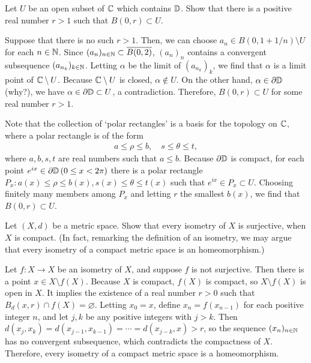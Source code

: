 \begin{prob}
    Let $U$ be an open subset of ${\mathbb{C}}$ which contains ${\mathbb{D}}$.
    Show that there is a positive real number $r>1$ such that $B(0, r)\subset U$.
\end{prob}
\begin{sol}
    Suppose that there is no such $r>1$.
    Then, we can choose $a_n\in B(0, 1+1/n)\setminus U$ for each $n\in{\mathbb{N}}$.
    Since $(a_n)_{n\in{\mathbb{N}}}\subset\overline{B(0, 2)}$, $(a_n)_n$ contains a convergent subsequence $(a_{n_k})_{k\in{\mathbb{N}}}$.
    Letting $\alpha$ be the limit of $(a_{n_k})_k$, we find that $\alpha$ is a limit point of ${\mathbb{C}}\setminus U$.
    Because ${\mathbb{C}}\setminus U$ is closed, $\alpha\notin U$.
    On the other hand, $\alpha\in\partial{\mathbb{D}}$ \color{brown}(why?)\color{black}, we have $\alpha\in\partial{\mathbb{D}}\subset U$, a contradiction.
    Therefore, $B(0, r)\subset U$ for some real number $r>1$.
\end{sol}
\begin{sol}
    Note that the collection of `polar rectangles' is a basis for the topology on ${\mathbb{C}}$, where a polar rectangle is of the form
    \begin{align*}
        a\leq \rho\leq b,\quad s\leq \theta\leq t,
    \end{align*}
    where $a, b, s, t$ are real numbers such that $a\leq b$.
    Because $\partial{\mathbb{D}}$ is compact, for each point $e^{ix}\in\partial{\mathbb{D}}\,(0\leq x<2\pi)$ there is a polar rectangle $P_x: a(x)\leq \rho\leq b(x), s(x)\leq \theta\leq t(x)$ such that $e^{ix}\in P_x\subset U$.
    Choosing finitely many members among $P_x$ and letting $r$ the smallest $b(x)$, we find that $B(0, r)\subset U$.
\end{sol}

\begin{prob}
    Let $(X, d)$ be a metric space.
    Show that every isometry of $X$ is surjective, when $X$ is compact.
    (In fact, remarking the definition of an isometry, we may argue that every isometry of a compact metric space is an homeomorphism.)
\end{prob}
\begin{sol}
    Let $f: X\rightarrow X$ be an isometry of $X$, and suppose $f$ is not surjective.
    Then there is a point $x\in X\setminus f(X)$.
    Because $X$ is compact, $f(X)$ is compact, so $X\setminus f(X)$ is open in $X$.
    It implies the existence of a real number $r>0$ such that $B_d(x, r)\cap f(X)=\varnothing$.
    Letting $x_0=x$, define $x_n=f(x_{n-1})$ for each positive integer $n$, and let $j, k$ be any positive integers with $j>k$.
    Then $d(x_j, x_k)=d(x_{j-1}, x_{k-1})=\cdots=d(x_{j-k}, x)>r$, so the sequence $(x_n)_{n\in{\mathbb{N}}}$ has no convergent subsequence, which contradicts the compactness of $X$.
    Therefore, every isometry of a compact metric space is a homeomorphism.
\end{sol}